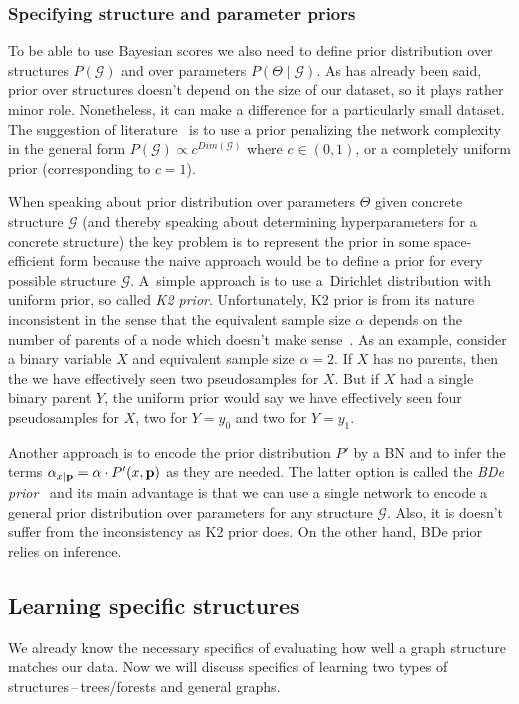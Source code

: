 \documentclass[english,cover]{fitthesis} %
\newcommand{\term}[1]{\emph{#1}}           %
\newcommand{\vars}[1]{{\bold{#1}}}         %
\begin{document}
\subsubsection{Specifying structure and parameter priors}
To be able to use Bayesian scores we also need to define prior distribution over structures $P(\mathcal{G})$ and over parameters $P(\Theta \mid \mathcal{G})$. As has already been said, prior over structures doesn't depend on the size of our dataset, so it plays rather minor role. Nonetheless, it can make a difference for a particularly small dataset. The suggestion of literature~\cite[p.~804]{pgm} is to use a prior penalizing the network complexity in the general form $P(\mathcal{G}) \propto c^{Dim(\mathcal{G})}$ where $c \in (0, 1)$, or a completely uniform prior (corresponding to $c = 1$).

\smallskip
When speaking about prior distribution over parameters $\Theta$ given concrete structure $\mathcal{G}$ (and thereby speaking about determining hyperparameters for a concrete structure) the key problem is to represent the prior in some space-efficient form because the naive approach would be to define a prior for every possible structure $\mathcal{G}$. A~simple approach is to use a~Dirichlet distribution with uniform prior, so called \term{K2 prior}. Unfortunately, K2 prior is from its nature inconsistent in the sense that the equivalent sample size $\alpha$ depends on the number of parents of a node which doesn't make sense~\cite[p.~806]{pgm}. As an example, consider a binary variable $X$ and equivalent sample size $\alpha=2$. If $X$ has no parents, then the we have effectively seen two pseudosamples for $X$. But if $X$ had a single binary parent $Y$, the uniform prior would say we have effectively seen four pseudosamples for $X$, two for $Y = y_0$ and two for $Y = y_1$.

Another approach is to encode the prior distribution $P'$ by a BN and to infer the terms $\alpha_{x \mid \vars{p}} = \alpha \cdot P'(x, \vars{p})$ as they are needed. The latter option is called the \term{BDe prior}~\cite[p.~806]{pgm} and its main advantage is that we can use a single network to encode a general prior distribution over parameters for any structure $\mathcal{G}$. Also, it is doesn't suffer from the inconsistency as K2 prior does. On the other hand, BDe prior relies on inference.



\subsection{Learning specific structures}
We already know the necessary specifics of evaluating how well a graph structure matches our data. Now we will discuss specifics of learning two types of structures\,--\,trees/forests and general graphs. 
\end{document}
